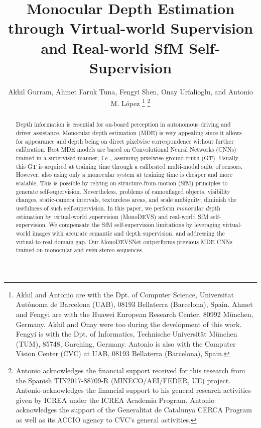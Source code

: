 \documentclass[journal]{IEEEtran}
\makeatletter
\DeclareRobustCommand\onedot{\futurelet\@let@token\@onedot}
\def\@onedot{\ifx\@let@token.\else.\null\fi\xspace}
\def\ie{\emph{i.e}\onedot} \def\Ie{\emph{I.e}\onedot}
\makeatother
\begin{document}
\title{Monocular Depth Estimation through Virtual-world Supervision and Real-world SfM Self-Supervision}


\author{Akhil Gurram,
        Ahmet Faruk Tuna,
        Fengyi Shen,
        Onay Urfalioglu,
        and Antonio M. L\'opez
\thanks{Akhil and Antonio are with the Dpt. of Computer Science, Universitat Aut\`onoma de Barcelona (UAB), 08193 Bellaterra (Barcelona), Spain. Ahmet and Fengyi are with the Huawei European Research Center, 80992 M{\"u}nchen, Germany. Akhil and Onay were too during the development of this work. Fengyi is with the Dpt. of Informatics, Technische Universit\"at München (TUM), 85748, Garching, Germany. Antonio is also with the Computer Vision Center (CVC) at UAB, 08193 Bellaterra (Barcelona), Spain.}      
\thanks{Antonio acknowledges the financial support received for this research from the Spanish TIN2017-88709-R (MINECO/AEI/FEDER, UE) project. Antonio acknowledges the financial support to his general research activities given by ICREA under the ICREA Academia Program. Antonio acknowledges the support of the Generalitat de Catalunya CERCA Program as well as its ACCIO agency to CVC's general activities.}
}










\maketitle

\begin{abstract}
Depth information is essential for on-board perception in autonomous driving and driver assistance. Monocular depth estimation (MDE) is very appealing since it allows for appearance and depth being on direct pixelwise correspondence without further calibration. Best MDE models are based on Convolutional Neural Networks (CNNs) trained in a supervised manner, {\ie}, assuming pixelwise ground truth (GT). Usually, this GT is acquired at training time through a calibrated multi-modal suite of sensors. However, also using only a monocular system at training time is cheaper and more scalable. This is possible by relying on structure-from-motion (SfM) principles to generate self-supervision. Nevertheless, problems of camouflaged objects, visibility changes, static-camera intervals, textureless areas, and scale ambiguity, diminish the usefulness of such self-supervision. In this paper, we perform \emph{mono}cular \emph{d}epth \emph{e}stimation by \emph{v}irtual-world \emph{s}upervision (MonoDEVS) and real-world SfM self-supervision. We compensate the SfM self-supervision limitations by leveraging virtual-world images with accurate semantic and depth supervision, and addressing the virtual-to-real domain gap. Our MonoDEVSNet outperforms previous MDE CNNs trained on monocular and even stereo sequences.
\end{abstract}
\end{document}
